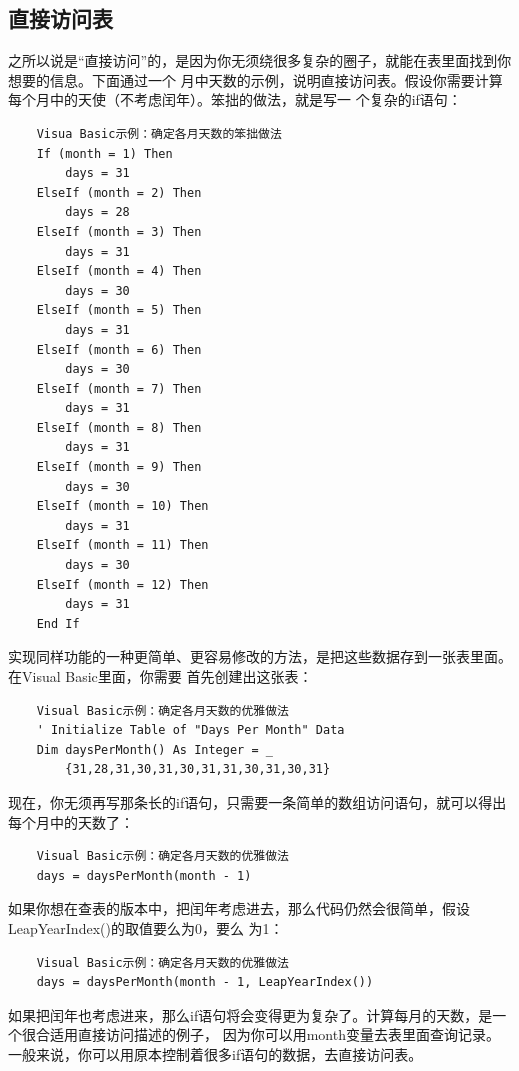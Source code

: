 \documentclass{article}
\begin{document}
\subsection{直接访问表}
之所以说是“直接访问”的，是因为你无须绕很多复杂的圈子，就能在表里面找到你想要的信息。下面通过一个
月中天数的示例，说明直接访问表。假设你需要计算每个月中的天使（不考虑闰年）。笨拙的做法，就是写一
个复杂的if语句：
\begin{lstlisting}
    Visua Basic示例：确定各月天数的笨拙做法
    If (month = 1) Then
        days = 31
    ElseIf (month = 2) Then
        days = 28
    ElseIf (month = 3) Then
        days = 31
    ElseIf (month = 4) Then
        days = 30
    ElseIf (month = 5) Then
        days = 31
    ElseIf (month = 6) Then
        days = 30
    ElseIf (month = 7) Then
        days = 31
    ElseIf (month = 8) Then
        days = 31
    ElseIf (month = 9) Then
        days = 30
    ElseIf (month = 10) Then
        days = 31
    ElseIf (month = 11) Then
        days = 30
    ElseIf (month = 12) Then
        days = 31
    End If
\end{lstlisting}
实现同样功能的一种更简单、更容易修改的方法，是把这些数据存到一张表里面。在Visual Basic里面，你需要
首先创建出这张表：
\begin{lstlisting}
    Visual Basic示例：确定各月天数的优雅做法
    ' Initialize Table of "Days Per Month" Data
    Dim daysPerMonth() As Integer = _
        {31,28,31,30,31,30,31,31,30,31,30,31}
\end{lstlisting}
现在，你无须再写那条长的if语句，只需要一条简单的数组访问语句，就可以得出每个月中的天数了：
\begin{lstlisting}
    Visual Basic示例：确定各月天数的优雅做法
    days = daysPerMonth(month - 1)
\end{lstlisting}
如果你想在查表的版本中，把闰年考虑进去，那么代码仍然会很简单，假设LeapYearIndex()的取值要么为0，要么
为1：
\begin{lstlisting}
    Visual Basic示例：确定各月天数的优雅做法
    days = daysPerMonth(month - 1, LeapYearIndex())
\end{lstlisting}
如果把闰年也考虑进来，那么if语句将会变得更为复杂了。计算每月的天数，是一个很合适用直接访问描述的例子，
因为你可以用month变量去表里面查询记录。一般来说，你可以用原本控制着很多if语句的数据，去直接访问表。
\end{document}
